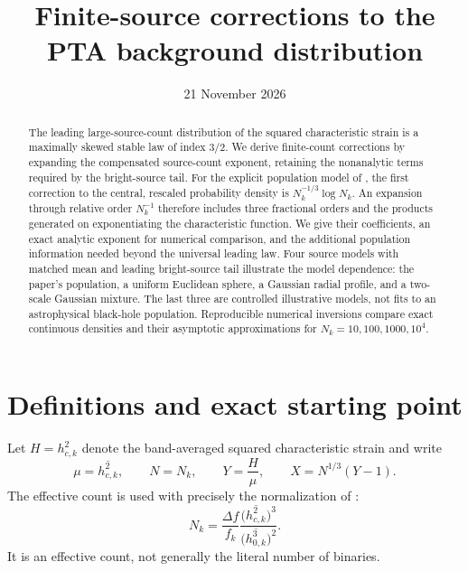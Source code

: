 \documentclass[11pt]{article}
\title{Finite-source corrections to the PTA background distribution}
\author{}
\date{21 November 2026}
\begin{document}
\maketitle
\vspace{-2em}
\begin{abstract}
The leading large-source-count distribution of the squared characteristic
strain is a maximally skewed stable law of index $3/2$. We derive finite-count
corrections by expanding the compensated source-count exponent, retaining the
nonanalytic terms required by the bright-source tail. For the explicit
population model of \citet{AliHaimoud2026}, the first correction to the central,
rescaled probability density is $N_k^{-1/3}\log N_k$. An expansion through
relative order $N_k^{-1}$ therefore includes three fractional orders and the
products generated on exponentiating the characteristic function. We give
their coefficients, an exact analytic exponent for numerical comparison, and
the additional population information needed beyond the universal leading
law. Four source models with matched mean and leading bright-source tail
illustrate the model dependence: the paper's population, a uniform Euclidean
sphere, a Gaussian radial profile, and a two-scale Gaussian mixture. The last
three are controlled illustrative models, not fits to an astrophysical
black-hole population. Reproducible numerical inversions compare exact
continuous densities and their asymptotic approximations for
$N_k=10,100,1000,10^4$.
\end{abstract}

\section{Definitions and exact starting point}
\label{sec:setup}

Let $H=h_{c,k}^2$ denote the band-averaged squared characteristic strain and
write
\begin{equation}
 \mu=\overline{h_{c,k}^2},\qquad
 N=N_k,\qquad Y=\frac{H}{\mu},\qquad X=N^{1/3}(Y-1).
 \label{eq:variables}
\end{equation}
The effective count is used with precisely the normalization of
\citet[Eq.~(25)]{AliHaimoud2026}:
\begin{equation}
 N_k=\frac{\Delta f}{f_k}
 \frac{\bigl(\overline{h_{c,k}^2}\bigr)^3}
 {\bigl(\overline{h_{0,k}^3}\bigr)^2}.
 \label{eq:effectiveN}
\end{equation}
It is an effective count, not generally the literal number of binaries.
\end{document}

